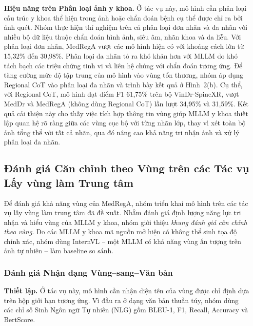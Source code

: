 \documentclass[12pt,a4paper,oneside]{extarticle}
\begin{document}
\noindent\textbf{Hiệu năng trên Phân loại ảnh y khoa.} Ở tác vụ này, mô hình cần phân loại cấu
trúc y khoa thể hiện trong ảnh hoặc chẩn đoán bệnh cụ thể được chỉ ra bởi ảnh quét. Nhóm thực
hiện thí nghiệm trên cả phân loại đơn nhãn và đa nhãn với nhiều bộ dữ liệu thuộc chẩn đoán hình
ảnh, siêu âm, nhãn khoa và da liễu. Với phân loại đơn nhãn, MedRegA vượt các mô hình hiện có với
khoảng cách lớn từ 15,32\% đến 30,98\%. Phân loại đa nhãn tỏ ra khó khăn hơn với MLLM do khó tách
bạch các triệu chứng tinh vi và liên hệ chúng với chẩn đoán tương ứng. Để tăng cường mức độ tập
trung của mô hình vào vùng tổn thương, nhóm áp dụng Regional CoT vào phân loại đa nhãn và trình
bày kết quả ở Hình~2(b). Cụ thể, với Regional CoT, mô hình đạt điểm F1 61,75\% trên bộ
VinDr-SpineXR, vượt MedDr và MedRegA (không dùng Regional CoT) lần lượt 34,95\% và 31,59\%. Kết
quả cải thiện này cho thấy việc tích hợp thông tin vùng giúp MLLM y khoa thiết lập quan hệ rõ
ràng giữa các vùng cục bộ với từng nhãn lớp, thay vì xét toàn bộ ảnh tổng thể với tất cả nhãn,
qua đó nâng cao khả năng tri nhận ảnh và xử lý phân loại đa nhãn.

\subsection{Đánh giá Căn chỉnh theo Vùng trên các Tác vụ Lấy vùng làm Trung tâm}

Để đánh giá khả năng vùng của MedRegA, nhóm triển khai mô hình trên các tác vụ lấy vùng làm
trung tâm đã đề xuất. Nhằm đánh giá định lượng năng lực tri nhận và hiểu vùng của MLLM y khoa,
nhóm giới thiệu \emph{khung đánh giá căn chỉnh theo vùng}. Do các MLLM y khoa mã nguồn mở hiện
có không thể sinh tọa độ chính xác, nhóm dùng InternVL -- một MLLM có khả năng vùng ấn tượng trên
ảnh tự nhiên -- làm baseline so sánh.

\subsubsection{Đánh giá Nhận dạng Vùng--sang--Văn bản}

\noindent\textbf{Thiết lập.} Ở tác vụ này, mô hình cần nhận diện tên của vùng được chỉ định dựa
trên hộp giới hạn tương ứng. Vì đầu ra ở dạng văn bản thuần túy, nhóm dùng các chỉ số Sinh Ngôn
ngữ Tự nhiên (NLG) gồm BLEU-1, F1, Recall, Accuracy và BertScore.
\end{document}

